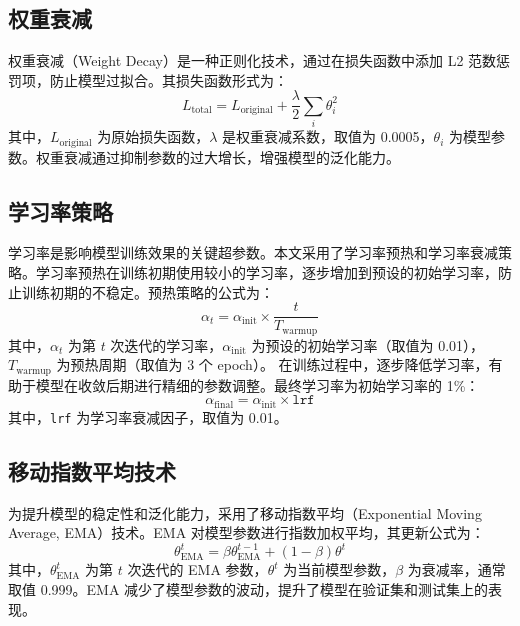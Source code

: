 \subsection{权重衰减}
权重衰减（Weight Decay）是一种正则化技术，通过在损失函数中添加 L2 范数惩罚项，防止模型过拟合。其损失函数形式为：
\begin{equation}
	L_{\text{total}} = L_{\text{original}} + \frac{\lambda}{2} \sum_{i} \theta_i^2
\end{equation}
其中，$L_{\text{original}}$ 为原始损失函数，$\lambda$ 是权重衰减系数，取值为 0.0005，$\theta_i$ 为模型参数。权重衰减通过抑制参数的过大增长，增强模型的泛化能力。

\subsection{学习率策略}
学习率是影响模型训练效果的关键超参数。本文采用了学习率预热和学习率衰减策略。学习率预热在训练初期使用较小的学习率，逐步增加到预设的初始学习率，防止训练初期的不稳定。预热策略的公式为：
\begin{equation}
	\alpha_t = \alpha_{\text{init}} \times \frac{t}{T_{\text{warmup}}}
\end{equation}
其中，$\alpha_t$ 为第 $t$ 次迭代的学习率，$\alpha_{\text{init}}$ 为预设的初始学习率（取值为 0.01），$T_{\text{warmup}}$ 为预热周期（取值为 3 个 epoch）。
在训练过程中，逐步降低学习率，有助于模型在收敛后期进行精细的参数调整。最终学习率为初始学习率的 1\%：
\begin{equation}
	\alpha_{\text{final}} = \alpha_{\text{init}} \times \texttt{lrf}
\end{equation}
其中，\texttt{lrf} 为学习率衰减因子，取值为 0.01。

\subsection{移动指数平均技术}
为提升模型的稳定性和泛化能力，采用了移动指数平均（Exponential Moving Average, EMA）技术。EMA 对模型参数进行指数加权平均，其更新公式为：
\begin{equation}
	\theta_{\text{EMA}}^t = \beta \theta_{\text{EMA}}^{t-1} + (1 - \beta) \theta^t
\end{equation}
其中，$\theta_{\text{EMA}}^t$ 为第 $t$ 次迭代的 EMA 参数，$\theta^t$ 为当前模型参数，$\beta$ 为衰减率，通常取值 0.999。EMA 减少了模型参数的波动，提升了模型在验证集和测试集上的表现。

